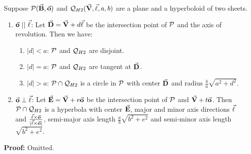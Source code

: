 \begin{lemma}
\label{lemma:hy2-vector-para&perp}
     Suppose ${\cal P}(\vec{\bf B},\vec{\bf o})$ and
${\cal Q}_{H2}(\vec{\bf V},\vec{\bf \ell},a,b)$ are a plane and a hyperboloid of
two sheets.
\begin{enumerate}
     \item $\vec{\bf o}\ ||\ \vec{\bf \ell}$:
          Let $\vec{\bf D}=\vec{\bf V}+d\vec{\bf \ell}$ be the intersection point of
          ${\cal P}$ and the axis of revolution.  Then we have:
     \begin{enumerate}
          \item $|d|<a$: ${\cal P}$ and ${\cal Q}_{H2}$ are disjoint.
          \item $|d|=a$: ${\cal P}$ and ${\cal Q}_{H2}$ are tangent at
               $\vec{\bf D}$.
          \item $|d|>a$: ${\cal P}\cap{\cal Q}_{H2}$ is a circle in ${\cal P}$
               with center $\vec{\bf D}$ and radius $\frac{b}{a}\sqrt{a^2+d^2}$.
     \end{enumerate}
     \item $\vec{\bf o}\perp\vec{\bf \ell}$:
          Let $\vec{\bf E}=\vec{\bf V}+e\vec{\bf o}$ be the intersection
          point of ${\cal P}$ and $\vec{\bf V}+t\vec{\bf o}$.
          Then ${\cal P}\cap{\cal Q}_{H2}$ is a hyperbola with center
          $\vec{\bf E}$, major and minor axis directions $\vec{\bf \ell}$ and
          $\frac{\vec{\bf \ell}\times\vec{\bf o}}{|\vec{\bf \ell}\times\vec{\bf o}|}$,
          semi-major axis length $\frac{a}{b}\sqrt{b^2+e^2}$ and semi-minor
          axis length $\sqrt{b^2+e^2}$.
\end{enumerate}
\end{lemma}
{\bf Proof:} Omitted. \QED

